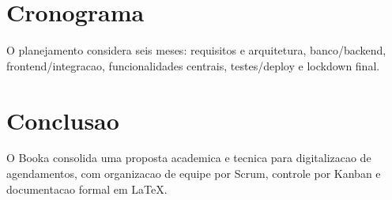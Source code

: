 \documentclass[12pt,a4paper]{article}
\begin{document}
\section{Cronograma}

O planejamento considera seis meses: requisitos e arquitetura, banco/backend, frontend/integracao, funcionalidades centrais, testes/deploy e lockdown final.

\section{Conclusao}

O Booka consolida uma proposta academica e tecnica para digitalizacao de agendamentos, com organizacao de equipe por Scrum, controle por Kanban e documentacao formal em LaTeX.



\end{document}

